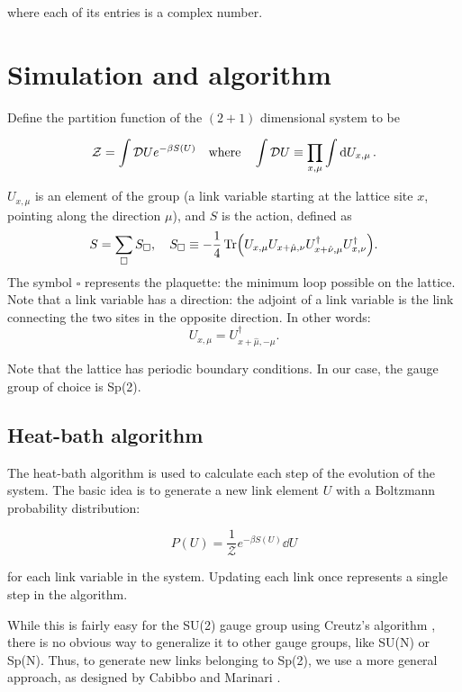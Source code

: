 \documentclass[reqno,12pt]{article}
\numberwithin{equation}{section}
\begin{document}
where each of its entries is a complex number. 

\section{Simulation and algorithm}

Define the partition function of the $(2+1)$ dimensional system to be

\begin{equation}
	\mathcal{Z} = \int \mathcal{D}U e^{-\beta S(U)} \qq{where} \int \mathcal{D} U \equiv \prod_{x,\mu} \int \dd{U_{x,\mu}}.
\end{equation}

$U_{x,\mu}$ is an element of the group (a link variable starting at the lattice site $x$, pointing
along the direction $\mu$), 
and $S$ is the action, defined as
\begin{equation}
	S = \sum_\square S_\square \qc 
	S_\square \equiv - \frac{1}{4} \Tr(U_{x,\mu}U_{x+\hat{\mu}, \nu}U^\dagger_{x+\hat{\nu}, \mu}U^\dagger_{x,\nu}).
\end{equation}
The symbol $\square$ represents the plaquette: the minimum loop possible on the lattice. Note that a link 
variable has a direction: the adjoint of a link variable is the link connecting the two sites in the opposite
direction. In other words:
\begin{equation}
	U_{x,\mu} = U_{x+\hat{\mu}, -\mu}^\dagger.
\end{equation}

Note that the lattice has periodic boundary conditions. In our case, the gauge group of choice is Sp(2).

\subsection{Heat-bath algorithm}

The heat-bath algorithm is used to calculate each step of the evolution of the system.
The basic idea is to generate a new link element $U$ with a Boltzmann probability distribution:

\begin{equation}
	P(U) = \frac{1}{\mathcal{Z}} e^{-\beta S(U)} \dd{U}
\end{equation}  

for each link variable in the system. Updating each link once represents a single step in the algorithm. 

While this is fairly easy for the SU(2) gauge group using Creutz's algorithm \cite{creutz}, there is no obvious
way to generalize it to other gauge groups, like SU(N) or Sp(N). Thus, to generate new links belonging to Sp(2), we use
a more general approach, as designed by Cabibbo and Marinari \cite{cabibbo}.  
\end{document}
